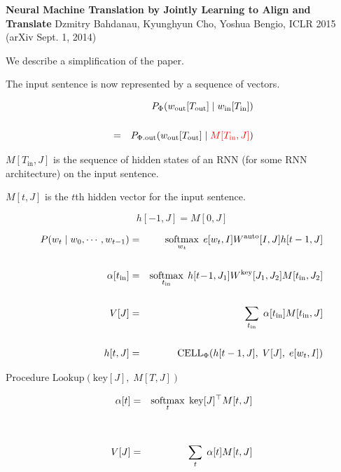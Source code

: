 {

{\bf Neural Machine Translation by Jointly Learning to {\color{red} Align} and Translate}
Dzmitry Bahdanau, Kyunghyun Cho, Yoshua Bengio, ICLR 2015 (arXiv Sept. 1, 2014)

\vfill
We describe a simplification of the paper.


The input sentence is now represented by a sequence of vectors.

\vfill
\begin{eqnarray*}
 & & P_\Phi(w_{\mathrm{out}}[T_{\mathrm{out}}] \;|\; w_{\mathrm{in}}[T_{\mathrm{in}}]) \\
 \\
& = & P_{\Phi.\mathrm{out}}(w_{\mathrm{out}}[T_{\mathrm{out}}]\;|\;
{\color{red} M[T_\mathrm{in},J]})
\end{eqnarray*}

\vfill
{\color{red} $M[T_{\mathrm{in}},J]$} is the sequence of hidden states of an RNN
(for some RNN architecture) on the input sentence.

\vfill
{\color{red} $M[t,J]$} is the $t$th hidden vector for the input sentence.




$$h[-1,J] =  M[0,J]$$

\begin{eqnarray*}
P(w_t\;|\;w_0,\cdots,w_{t-1}) & = & \operatorname*{softmax}_{w_t}\;e[w_t,I]W^{\mathrm{auto}}[I,J]h[t-1,J] \\
\\
\alpha[t_{\mathrm{in}}]& =& \operatorname*{softmax}_{t_\mathrm{in}} \;h[t\!-\!1,J_1]W^{\mathrm{key}}[J_1,J_2]M[t_{\mathrm{in}},J_2]\\
\\
V[J]& = & \sum_{t_{\mathrm{in}}}\;\alpha[t_{\mathrm{in}}]M[t_{\mathrm{in}},J] \\
\\
h[t,J] & = & \mathrm{CELL}_\Phi (h[t-1,J],\;V[J],\;e[w_t,I])
\end{eqnarray*}


Procedure $\mathrm{Lookup}(\mathrm{key}[J],\;M[T,J])$

\bigskip
\begin{eqnarray*}
\alpha[t]& =& \operatorname*{softmax}_t \;\mathrm{key}[J]^\top M[t,J]\\
\\
\\
V[J]& =& \sum_t\;\alpha[t]M[t,J]
\end{eqnarray*}

}
